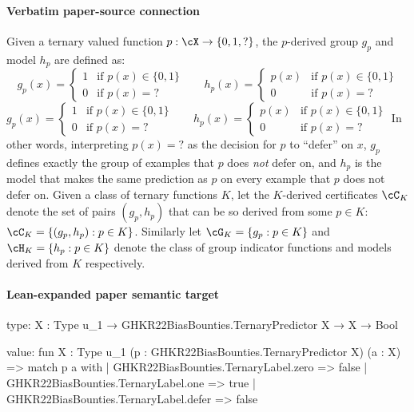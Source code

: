 \documentclass[10pt]{article}
\begin{document}
\paragraph{Verbatim paper-source connection}
\begin{ReviewVerbatim}
\begin{definition}
Given a ternary valued function $p:\cX\rightarrow \{0,1,?\}$, the $p$-derived group $g_p$ and model $h_p$ are defined as:
\ifdraft
$$g_p(x) = \begin{cases}
      1 & \text{if } p(x) \in \{0,1\} \\
      0 & \text{if } p(x) = ?
   \end{cases} \ \ \ \ \ \ \  \ h_p(x) = \begin{cases}
      p(x) & \text{if } p(x) \in \{0,1\} \\
      0 & \text{if } p(x) = ?
   \end{cases}$$
\else $g_p(x) = \begin{cases}
      1 & \text{if } p(x) \in \{0,1\} \\
      0 & \text{if } p(x) = ?
   \end{cases} \ \ \ \ \ \ \  \ h_p(x) = \begin{cases}
      p(x) & \text{if } p(x) \in \{0,1\} \\
      0 & \text{if } p(x) = ?
   \end{cases}$ \fi
In other words, interpreting $p(x) = ?$ as the decision for $p$ to ``defer'' on $x$, $g_p$ defines exactly the group of examples that $p$ does \emph{not} defer on, and $h_p$ is the model that makes the same prediction as $p$ on every example that $p$ does not defer on. Given a class of ternary functions $K$, let the $K$-derived certificates $\cC_K$ denote the set of pairs $(g_p,h_p)$ that can be so derived from some $p \in K$: $\cC_K = \{(g_p,h_p) : p \in K\}$. Similarly let $\cG_K = \{g_p : p \in K\}$ and $\cH_K = \{h_p : p \in K\}$ denote the class of group indicator functions and models derived from $K$ respectively.
\end{definition}
\end{ReviewVerbatim}



\paragraph{Lean-expanded paper semantic target}
\begin{ReviewVerbatim}
type:
{X : Type u_1} → GHKR22BiasBounties.TernaryPredictor X → X → Bool

value:
fun {X : Type u_1} (p : GHKR22BiasBounties.TernaryPredictor X) (a : X) =>
  match p a with
  | GHKR22BiasBounties.TernaryLabel.zero => false
  | GHKR22BiasBounties.TernaryLabel.one => true
  | GHKR22BiasBounties.TernaryLabel.defer => false
\end{ReviewVerbatim}
\end{document}

